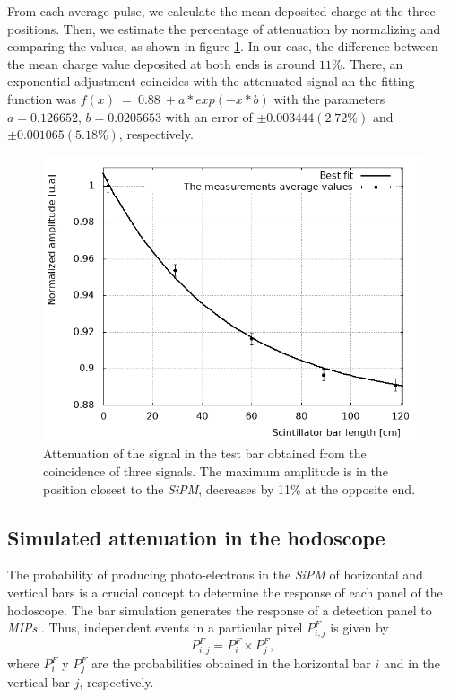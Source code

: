 \documentclass[submitting]{nst}
\begin{document}
From each average pulse, we calculate the mean deposited charge at the three positions. Then, we estimate the percentage of attenuation by normalizing and comparing the values, as shown in figure \ref{experimental_attenuation}. In our case, the difference between the mean charge value deposited at both ends is around $11$\%.  There, an exponential adjustment coincides with the attenuated signal an the fitting function was 
$f(x)~=~0.88~+a*exp(-x*b)$ with the parameters $a=0.126652$, $b= 0.0205653$ with an error of  $\pm 0.003444 (2.72\%)$ and $\pm 0.001065 (5.18\%)$, respectively.
\begin{figure}[h!] %
    \centering
        \includegraphics[scale=0.49]{Figures/atenuacion_esperimental.png}
   \caption{Attenuation of the signal in the test bar obtained from the coincidence of three signals. The maximum amplitude is in the position closest to the \textsl{SiPM}, decreases by 11\% at the opposite end.} \label{experimental_attenuation}
\end{figure}

\subsection{Simulated attenuation in the hodoscope}
\label{sec:hodoscope-response-two} %
The probability of producing photo-electrons in the \textsl{SiPM} of horizontal and vertical bars is a crucial concept to determine the response of each panel of the hodoscope. The bar simulation generates the response of a detection panel to \textsl{MIPs} . Thus, independent events in a particular pixel $P^{F}_{i,j}$ is given by 
\begin{equation}
\label{pe_panel}
P^{F}_{i,j}=P^{F}_{i} \times P^{F}_{j},
\end{equation}
where $P^{F}_{i}$ y $P^{F}_j$ are the probabilities obtained in the horizontal bar $i$ and in the vertical bar $j$, respectively.
\end{document}
